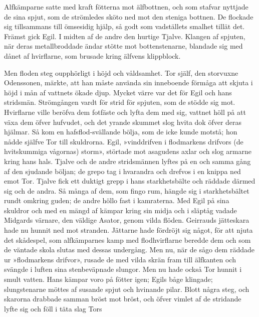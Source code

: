 Alfkämparne satte med kraft fötterna mot älfbottnen, och som stafvar
nyttjade de sina spjut, som de strömledes sköto ned mot den steniga
bottnen. De flockade sig tillsammans till ömsesidig hjälp, så godt som
vadställets smalhet tillät det. Främst gick Egil. I midten af de andre
den hurtige Tjalve. Klangen af spjuten, när deras metallbroddade
\protect\hypertarget{lb1625905.xhtmlux5cux23start54}{}{}\protect\hypertarget{lb1625905.xhtmlux5cux23start54-a}{}{}\protect\hypertarget{lb1625905.xhtmlux5cux23start54-b}{}{}\protect\hypertarget{lb1625905.xhtmlux5cux23start54-c}{}{}\protect\hypertarget{lb1625905.xhtmlux5cux23start54-d}{}{}
ändar stötte mot bottenstenarne, blandade sig med dånet af hvirflarne,
som brusade kring älfvens klippblock.

Men floden steg oupphörligt i höjd och våldsamhet. Tor själf, den
storvuxne Odenssonen, märkte, att han måste använda sin inneboende
förmåga att skjuta i höjd i mån af vattnets ökade djup. Mycket värre var
det för Egil och hans stridsmän. Strömgången vardt för strid för
spjuten, som de stödde sig mot. Hvirflarne ville beröfva dem fotfäste
och lyfta dem med sig, vattnet höll på att växa dem öfver hufvudet, och
det yrande skummet slog hvita dok öfver deras hjälmar. Så kom en
hafsflod-svällande bölja, som de icke kunde motstå; hon nådde själfve
Tor till skuldrorna. Egil, »vinddrifven i flodmarkens drifvors (de
hvitskummiga vågornas) storm», störtade mot asagudens axlar och slog
armarne kring hans hals. Tjalve och de andre stridsmännen lyftes på en
och samma gång af den sjudande böljan; de grepo tag i hvarandra och
drefvos i en knippa ned emot Tor. Tjalve fick ett duktigt grepp i hans
starkhetsbälte och räddade därmed sig och de andra. Så många af dem, som
fingo rum, hängde sig i starkhetsbältet rundt omkring guden; de andre
höllo fast i kamraterna. Med Egil på sina skuldror och med en mängd af
kämpar kring sin midja och i släptåg vadade Midgards värnare, den
väldige Asator, genom vilda flöden. Geirrauds jätteskara hade nu hunnit
ned mot stranden. Jättarne hade fördröjt sig något, för att njuta det
skådespel, som alfkämparnes kamp med flodhvirflarne beredde dem och som
de väntade skola slutas med dessas undergång. Men nu, när de sågo dem
räddade ur »flodmarkens drifvor», rusade de med vilda skrän fram till
älfkanten och svängde i luften sina stenbeväpnade slungor. Men nu hade
också Tor hunnit i smult vatten. Hans kämpar voro på fötter igen; Egils
båge klingade; slungstenarne möttes af susande spjut och hvinande pilar.
Blott några steg, och skarorna drabbade samman bröst mot bröst, och
öfver vimlet af de stridande lyfte sig och föll i täta slag Tors
